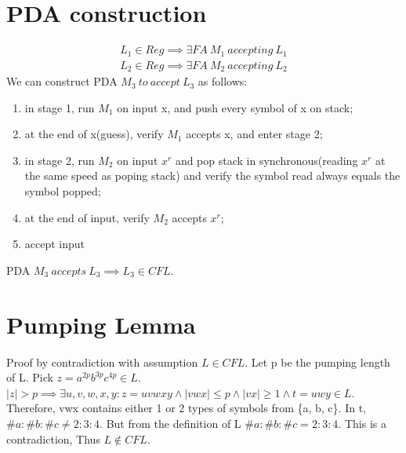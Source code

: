 \documentclass{article}
\begin{document}
\section{PDA construction}
\begin{align*}
L_1 \in Reg \implies \exists FA \ M_1 \ accepting \ L_1\\
L_2 \in Reg \implies \exists FA \ M_2 \ accepting \ L_2
\end{align*}
We can construct PDA $M_3 \ to \ accept \ L_3$ as follows:
\begin{enumerate}
  \item in stage 1, run $M_1$ on input x, and push every symbol of x on stack;
  \item at the end of x(guess), verify $M_1$ accepts x, and enter stage 2;
  \item in stage 2, run $M_2$ on input $x^r$ and pop stack in
  synchronous(reading $x^r$ at the same speed as poping stack) and verify the
  symbol read always equals the symbol popped;
  \item at the end of input, verify $M_2$ accepts $x^r$;
  \item accept input
\end{enumerate}
PDA $M_3 \ accepts \ L_3 \implies L_3 \in CFL$.

\section{Pumping Lemma}
Proof by contradiction with assumption $L \in CFL$. Let p be the pumping length
of L. Pick $z = a^{2p}b^{3p}c^{4p} \in L$.$ \mid z \mid > p \implies \exists
u, v, w, x, y: z = uvwxy \land \mid vwx \mid \leq p \land \mid vx \mid \geq 1
\land t =uwy \in L$. Therefore, vwx contains either 1 or 2 types of symbols from
\{a, b, c\}. In t, $\#a:\#b:\#c \neq 2:3:4$. But from the definition of L
$\#a:\#b:\#c = 2:3:4$.  This is a contradiction, Thus $L \notin CFL$.
\end{document}
